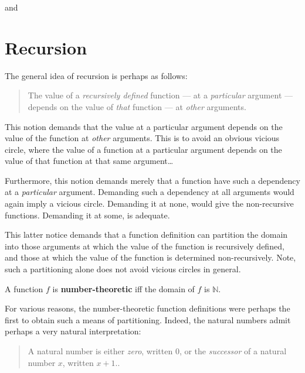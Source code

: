  and 

\section{Recursion}

The general idea of recursion is perhaps as follows:

\begin{quote}

The value of a \emph{recursively defined} function --- at a \emph{particular}
argument --- depends on the value of \emph{that} function --- at \emph{other}
arguments.

\end{quote}

This notion demands that the value at a particular argument depends on the
value of the function at \emph{other} arguments. This is to avoid an obvious
vicious circle, where the value of a function at a particular argument depends
on the value of that function at that same argument\ldots

Furthermore, this notion demands merely that a function have such a dependency
at a \emph{particular} argument. Demanding such a dependency at all arguments
would again imply a vicious circle. Demanding it at none, would give the
non-recursive functions. Demanding it at some, is adequate.

This latter notice demands that a function definition can partition the domain
into those arguments at which the value of the function is recursively defined,
and those at which the value of the function is determined non-recursively.
Note, such a partitioning alone does not avoid vicious circles in general.

\begin{definition} A function $f$ is \textbf{number-theoretic} iff the domain
of $f$ is $\mathbb{N}$. \end{definition}

For various reasons, the number-theoretic function definitions were perhaps the
first to obtain such a means of partitioning. Indeed, the natural numbers admit
perhaps a very natural interpretation:

\begin{quote}

A natural number is either \emph{zero}, written $0$, or the \emph{successor} of
a natural number $x$, written $x+1$.\cite{dedekind-1888, rose-1984,
odifreddi-1989}.

\end{quote}

